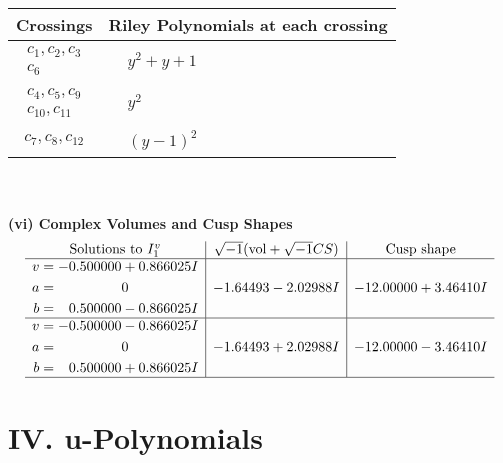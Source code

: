 \documentclass[1p]{elsarticle_modified}
\theoremstyle{definition}
\newcommand{\I}{\sqrt{-1}}
\begin{document}
\begin{tabular}{m{50pt}|m{274pt}}
Crossings & \hspace{64pt}Riley Polynomials at each crossing \\
\hline $$\begin{aligned}c_{1},c_{2},c_{3}\\c_{6}\end{aligned}$$&$\begin{aligned}
&y^2+y+1
\end{aligned}$\\
\hline $$\begin{aligned}c_{4},c_{5},c_{9}\\c_{10},c_{11}\end{aligned}$$&$\begin{aligned}
&y^2
\end{aligned}$\\
\hline $$\begin{aligned}c_{7},c_{8},c_{12}\end{aligned}$$&$\begin{aligned}
&(y-1)^2
\end{aligned}$\\
\hline
\end{tabular}\\~\\
\newpage\flushleft \textbf{(vi) Complex Volumes and Cusp Shapes}
$$\begin{array}{c|c|c}  
\text{Solutions to }I^v_{1}& \I (\text{vol} + \sqrt{-1}CS) & \text{Cusp shape}\\
 \hline 
\begin{aligned}
v &= -0.500000 + 0.866025 I \\
a &= \phantom{-0.000000 } 0 \\
b &= \phantom{-}0.500000 - 0.866025 I\end{aligned}
 & -1.64493 - 2.02988 I & -12.00000 + 3.46410 I \\ \hline\begin{aligned}
v &= -0.500000 - 0.866025 I \\
a &= \phantom{-0.000000 } 0 \\
b &= \phantom{-}0.500000 + 0.866025 I\end{aligned}
 & -1.64493 + 2.02988 I & -12.00000 - 3.46410 I\\
 \hline 
 \end{array}$$\newpage
\newpage\renewcommand{\arraystretch}{1}
\centering \section*{ IV. u-Polynomials}
\end{document}
